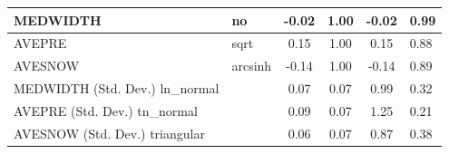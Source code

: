 \begin{table}
\begin{center}
\begin{tabular}{|l|l|c|c|c|l|}
			\hline
			MEDWIDTH & no & -0.02 & 1.00 & -0.02 & 0.99 \\
			\hline
			AVEPRE & sqrt & 0.15 & 1.00 & 0.15 & 0.88 \\
			\hline
			AVESNOW & arcsinh & -0.14 & 1.00 & -0.14 & 0.89 \\
			\hline
			MEDWIDTH (Std. Dev.) ln_normal &  & 0.07 & 0.07 & 0.99 & 0.32 \\
			\hline
			AVEPRE (Std. Dev.) tn_normal &  & 0.09 & 0.07 & 1.25 & 0.21 \\
			\hline
			AVESNOW (Std. Dev.) triangular &  & 0.06 & 0.07 & 0.87 & 0.38 \\
			\hline
		\end{tabular}
	\end{center}
\end{table}